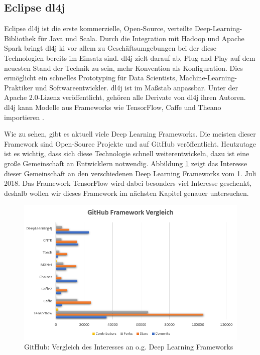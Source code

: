 \subsection{Eclipse \acl{dl4j}}
Eclipse \ac{dl4j} ist die erste kommerzielle, Open-Source, verteilte Deep-Learning-Bibliothek für Java und Scala. Durch die Integration mit Hadoop und Apache Spark bringt \ac{dl4j} \ac{ki} vor allem zu Geschäftsumgebungen bei der diese Technologien bereits im Einsatz sind. \ac{dl4j} zielt darauf ab, Plug-and-Play auf dem neuesten Stand der Technik zu sein, mehr Konvention als Konfiguration. Dies ermöglicht ein schnelles Prototyping für Data Scientists, Machine-Learning-Praktiker und Softwareentwickler. \ac{dl4j} ist im Maßstab anpassbar. Unter der Apache 2.0-Lizenz veröffentlicht, gehören alle Derivate von \ac{dl4j} ihren Autoren. \ac{dl4j} kann Modelle aus Frameworks wie TensorFlow, Caffe und Theano importieren \cite{dl4j}. \newline

Wie zu sehen, gibt es aktuell viele Deep Learning Frameworks. Die meisten dieser Framework sind Open-Source Projekte und auf GitHub veröffentlicht. Heutzutage ist es wichtig, dass sich diese Technologie schnell weiterentwickeln, dazu ist eine große Gemeinschaft an Entwicklern notwendig. Abbildung \ref{fig:githubinterestdeeplearning} zeigt das Interesse dieser Gemeinschaft an den verschiedenen Deep Learning Frameworks vom 1. Juli 2018. Das Framework TensorFlow wird dabei besonders viel Interesse geschenkt, deshalb wollen wir dieses Framework im nächsten Kapitel genauer untersuchen.

\begin{figure}
	\centering
	\includegraphics[width=0.9\linewidth]{Pictures/GitHubFrameworkVergleich}
	\caption[GitHub: Vergleich des Interesses in verschiedene Deep Learning Frameworks]{GitHub: Vergleich des Interesses an o.g. Deep Learning Frameworks}
	\label{fig:githubinterestdeeplearning}
\end{figure}
